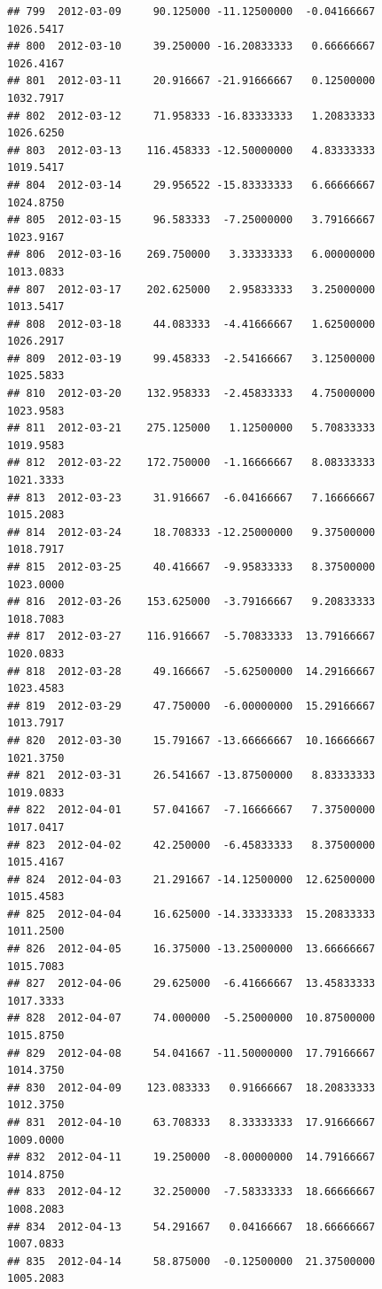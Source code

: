 \documentclass[
]{article}
\begin{document}
\begin{verbatim}
## 799  2012-03-09     90.125000 -11.12500000  -0.04166667    1026.5417
## 800  2012-03-10     39.250000 -16.20833333   0.66666667    1026.4167
## 801  2012-03-11     20.916667 -21.91666667   0.12500000    1032.7917
## 802  2012-03-12     71.958333 -16.83333333   1.20833333    1026.6250
## 803  2012-03-13    116.458333 -12.50000000   4.83333333    1019.5417
## 804  2012-03-14     29.956522 -15.83333333   6.66666667    1024.8750
## 805  2012-03-15     96.583333  -7.25000000   3.79166667    1023.9167
## 806  2012-03-16    269.750000   3.33333333   6.00000000    1013.0833
## 807  2012-03-17    202.625000   2.95833333   3.25000000    1013.5417
## 808  2012-03-18     44.083333  -4.41666667   1.62500000    1026.2917
## 809  2012-03-19     99.458333  -2.54166667   3.12500000    1025.5833
## 810  2012-03-20    132.958333  -2.45833333   4.75000000    1023.9583
## 811  2012-03-21    275.125000   1.12500000   5.70833333    1019.9583
## 812  2012-03-22    172.750000  -1.16666667   8.08333333    1021.3333
## 813  2012-03-23     31.916667  -6.04166667   7.16666667    1015.2083
## 814  2012-03-24     18.708333 -12.25000000   9.37500000    1018.7917
## 815  2012-03-25     40.416667  -9.95833333   8.37500000    1023.0000
## 816  2012-03-26    153.625000  -3.79166667   9.20833333    1018.7083
## 817  2012-03-27    116.916667  -5.70833333  13.79166667    1020.0833
## 818  2012-03-28     49.166667  -5.62500000  14.29166667    1023.4583
## 819  2012-03-29     47.750000  -6.00000000  15.29166667    1013.7917
## 820  2012-03-30     15.791667 -13.66666667  10.16666667    1021.3750
## 821  2012-03-31     26.541667 -13.87500000   8.83333333    1019.0833
## 822  2012-04-01     57.041667  -7.16666667   7.37500000    1017.0417
## 823  2012-04-02     42.250000  -6.45833333   8.37500000    1015.4167
## 824  2012-04-03     21.291667 -14.12500000  12.62500000    1015.4583
## 825  2012-04-04     16.625000 -14.33333333  15.20833333    1011.2500
## 826  2012-04-05     16.375000 -13.25000000  13.66666667    1015.7083
## 827  2012-04-06     29.625000  -6.41666667  13.45833333    1017.3333
## 828  2012-04-07     74.000000  -5.25000000  10.87500000    1015.8750
## 829  2012-04-08     54.041667 -11.50000000  17.79166667    1014.3750
## 830  2012-04-09    123.083333   0.91666667  18.20833333    1012.3750
## 831  2012-04-10     63.708333   8.33333333  17.91666667    1009.0000
## 832  2012-04-11     19.250000  -8.00000000  14.79166667    1014.8750
## 833  2012-04-12     32.250000  -7.58333333  18.66666667    1008.2083
## 834  2012-04-13     54.291667   0.04166667  18.66666667    1007.0833
## 835  2012-04-14     58.875000  -0.12500000  21.37500000    1005.2083

\end{verbatim}
\end{document}
